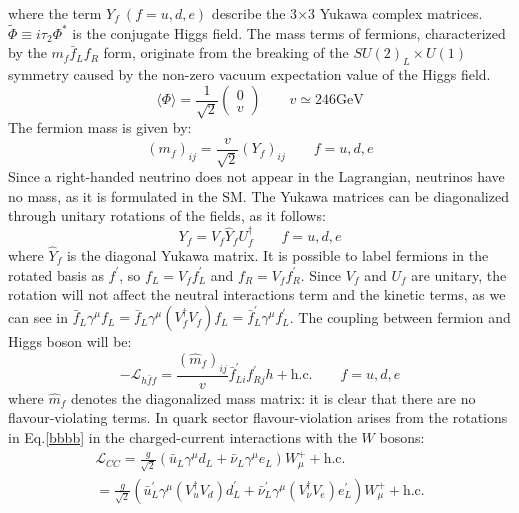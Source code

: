 where the term $Y_f \ (f  =  u,d,e)$ describe the 3$\times$3 
Yukawa complex matrices. $\widetilde{\Phi} \equiv i \tau_2 \Phi^*$ 
is the conjugate Higgs field. The mass terms of fermions, 
characterized by the $m_f \bar{f}_L f_R$ form, originate 
from the breaking of the $SU(2)_L \times U(1)$ symmetry 
caused by the non-zero vacuum expectation value of the Higgs field.
\begin{equation}\label{higgs}
\langle\Phi\rangle=\frac{1}{\sqrt{2}}\left(\begin{array}{l}
0 \\
v
\end{array}\right) \qquad v \simeq 246 \mathrm{GeV}
\end{equation}
The fermion mass is given by:
\begin{equation}
\left(m_f\right)_{i j}=\frac{v}{\sqrt{2}}\left(Y_f\right)_{i j} \qquad f=u, d, e
\end{equation}
Since a right-handed neutrino does not appear in the 
Lagrangian, neutrinos have no mass, as it is formulated 
in the SM. The Yukawa matrices can be diagonalized 
through unitary rotations of the fields, as it follows:
\begin{equation}\label{bbbb}
Y_f=V_f \hat{Y}_f U_f^{\dagger} \qquad f=u, d, e
\end{equation}
where $ \hat{Y}_f $ is the diagonal Yukawa matrix. 
It is possible to label fermions in the rotated basis 
as $f^{\prime}$, so $f_L=V_f f^{\prime}_L$ and $f_R=V_f f^{\prime}_R $. 
Since $V_f$ and $U_f$ are unitary, the rotation will not affect the 
neutral interactions term and the kinetic terms, as we can see 
in $\bar{f}_L \gamma^\mu f_L=\bar{f}_L \gamma^\mu\left(V_f^{\dagger} V_f\right) f_L=\bar{f}_L^{\prime} \gamma^\mu f_L^{\prime}$. 
The coupling between fermion and Higgs boson will be:
\begin{equation}
-\mathscr{L}_{h \bar{f} f}=\frac{(\hat{m}_f)_{i j}}{v} \bar{f}_{L i}^{\prime}f^{\prime}_{R j} h+\text{h.c.} \qquad f=u, d, e
\end{equation}
where $\hat{m}_f$ denotes the diagonalized mass matrix: it is clear that there are no flavour-violating terms.
In quark sector flavour-violation arises from the rotations 
in Eq.\ref{bbbb} in the charged-current interactions with the $W$ bosons:
\begin{equation}\label{quarkviolation}
\begin{array}{c}
      { \displaystyle 
\mathscr{L}_{C C}  =\frac{g}{\sqrt{2}}\left(\bar{u}_L \gamma^\mu d_L+\bar{\nu}_L \gamma^\mu e_L\right) W_\mu^{+}+\text {h.c.} }\\
 {\displaystyle=\frac{g}{\sqrt{2}}\left(\bar{u}^{\prime}_L \gamma^\mu\left(V_u^{\dagger} V_d\right) d_L^{\prime}+\bar{\nu}^{\prime}_L \gamma^\mu\left(V_\nu^{\dagger} V_e\right) e_L^{\prime}\right) W_\mu^{+}+\text {h.c.}}
\end{array}
\end{equation}

